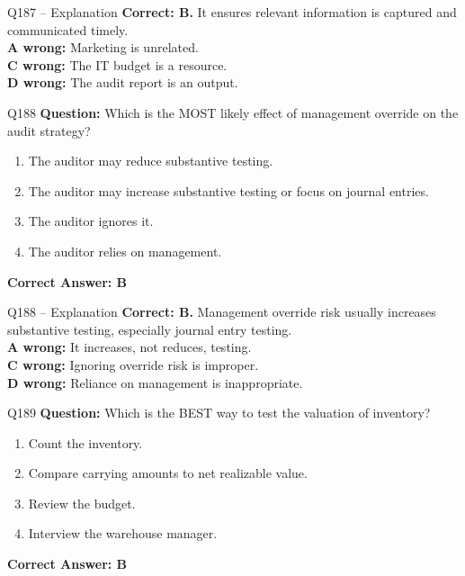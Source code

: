 \documentclass[aspectratio=169,10pt]{beamer}
\begin{document}
	\begin{frame}[t]{Q187 -- Explanation}
		\small
		\textbf{Correct: B.} It ensures relevant information is captured and communicated timely. \\[4pt]
		\textbf{A wrong:} Marketing is unrelated. \\[2pt]
		\textbf{C wrong:} The IT budget is a resource. \\[2pt]
		\textbf{D wrong:} The audit report is an output.
	\end{frame}
	
	\begin{frame}[t]{Q188}
		\small
		\textbf{Question:} Which is the MOST likely effect of management override on the audit strategy?
		\begin{enumerate}[label=\Alph*.,itemsep=1pt,topsep=2pt]
			\item The auditor may reduce substantive testing.
			\item The auditor may increase substantive testing or focus on journal entries.
			\item The auditor ignores it.
			\item The auditor relies on management.
		\end{enumerate}
		\vspace{4pt}
		\textbf{Correct Answer: B}
	\end{frame}
	
	\begin{frame}[t]{Q188 -- Explanation}
		\small
		\textbf{Correct: B.} Management override risk usually increases substantive testing, especially journal entry testing. \\[4pt]
		\textbf{A wrong:} It increases, not reduces, testing. \\[2pt]
		\textbf{C wrong:} Ignoring override risk is improper. \\[2pt]
		\textbf{D wrong:} Reliance on management is inappropriate.
	\end{frame}
	
	\begin{frame}[t]{Q189}
		\small
		\textbf{Question:} Which is the BEST way to test the valuation of inventory?
		\begin{enumerate}[label=\Alph*.,itemsep=1pt,topsep=2pt]
			\item Count the inventory.
			\item Compare carrying amounts to net realizable value.
			\item Review the budget.
			\item Interview the warehouse manager.
		\end{enumerate}
		\vspace{4pt}
		\textbf{Correct Answer: B}
	\end{frame}
	
\end{document}
